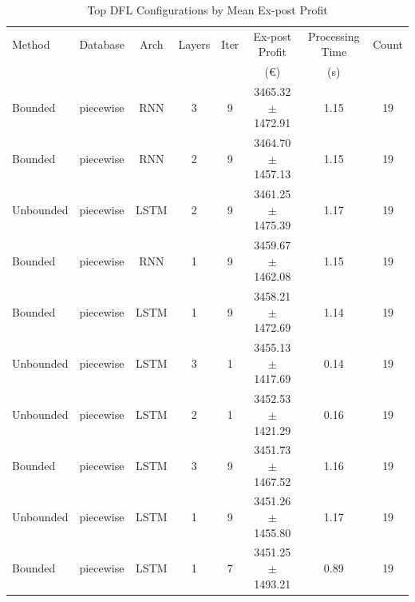\begin{table}[h]
\centering
\caption{Top DFL Configurations by Mean Ex-post Profit}
\label{tab:dfl_best_configs}
\begin{tabular}{llcccccc}
\toprule
Method & Database & Arch & Layers & Iter & Ex-post Profit & Processing Time & Count \\
 & & & & & (€) & (s) & \\
\midrule
Bounded & piecewise & RNN & 3 & 9 & 3465.32 $\pm$ 1472.91 & 1.15 & 19 \\
Bounded & piecewise & RNN & 2 & 9 & 3464.70 $\pm$ 1457.13 & 1.15 & 19 \\
Unbounded & piecewise & LSTM & 2 & 9 & 3461.25 $\pm$ 1475.39 & 1.17 & 19 \\
Bounded & piecewise & RNN & 1 & 9 & 3459.67 $\pm$ 1462.08 & 1.15 & 19 \\
Bounded & piecewise & LSTM & 1 & 9 & 3458.21 $\pm$ 1472.69 & 1.14 & 19 \\
Unbounded & piecewise & LSTM & 3 & 1 & 3455.13 $\pm$ 1417.69 & 0.14 & 19 \\
Unbounded & piecewise & LSTM & 2 & 1 & 3452.53 $\pm$ 1421.29 & 0.16 & 19 \\
Bounded & piecewise & LSTM & 3 & 9 & 3451.73 $\pm$ 1467.52 & 1.16 & 19 \\
Unbounded & piecewise & LSTM & 1 & 9 & 3451.26 $\pm$ 1455.80 & 1.17 & 19 \\
Bounded & piecewise & LSTM & 1 & 7 & 3451.25 $\pm$ 1493.21 & 0.89 & 19 \\
\bottomrule
\end{tabular}
\end{table}
